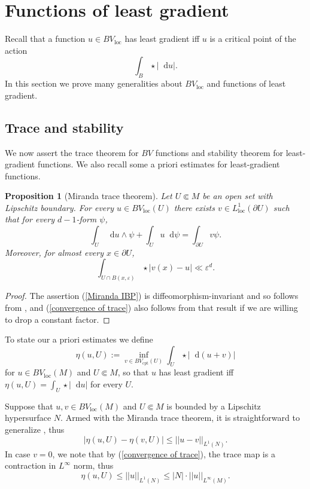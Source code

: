 \documentclass[reqno,12pt,letterpaper]{amsart}
\newcommand*\dif{\mathop{}\!\mathrm{d}}
\newcommand{\loc}{\mathrm{loc}}
\newcommand{\cpt}{\mathrm{cpt}}
\newtheorem{proposition}[theorem]{Proposition}
\theoremstyle{definition}
\numberwithin{equation}{section}
\begin{document}

\section{Functions of least gradient}\label{LeastGradientFunctions}
Recall that a function $u \in BV_\loc$ has least gradient iff $u$ is a critical point of the action
$$\int_B \star |\dif u|.$$
In this section we prove many generalities about $BV_\loc$ and functions of least gradient.

\subsection{Trace and stability}
We now assert the trace theorem for $BV$ functions and stability theorem for least-gradient functions.
We also recall some a priori estimates for least-gradient functions.

\begin{proposition}[Miranda trace theorem]\label{traces}
Let $U \Subset M$ be an open set with Lipschitz boundary.
For every $u \in BV_\loc(U)$ there exists $v \in L^1_\loc(\partial U)$ such that for every $d-1$-form $\psi$,
\begin{equation}\label{Miranda IBP}
\int_U \dif u \wedge \psi + \int_U u \dif \psi = \int_{\partial U} v\psi.
\end{equation}
Moreover, for almost every $x \in \partial U$,
\begin{equation}\label{convergence of trace}
\int_{U \cap B(x, \varepsilon)} \star |v(x) - u| \ll \varepsilon^d.
\end{equation}
\end{proposition}
\begin{proof}
The assertion (\ref{Miranda IBP}) is diffeomorphism-invariant and so follows from \cite[Teorema 1]{Miranda67}, and (\ref{convergence of trace}) also follows from that result if we are willing to drop a constant factor.
\end{proof}

To state our a priori estimates we define
$$\eta(u, U) := \inf_{v \in BV_\cpt(U)} \int_U \star |\dif(u + v)|$$
for $u \in BV_\loc(M)$ and $U \Subset M$, so that $u$ has least gradient iff $\eta(u, U) = \int_U \star |\dif u|$ for every $U$.

Suppose that $u, v \in BV_\loc(M)$ and $U \Subset M$ is bounded by a Lipschitz hypersurface $N$. Armed with the Miranda trace theorem, it is straightforward to generalize \cite[Lemma 5.6]{Giusti77}, thus
\begin{equation}
|\eta(u, U) - \eta(v, U)| \leq ||u - v||_{L^1(N)}. \label{a priori estimate 1}
\end{equation}
In case $v = 0$, we note that by (\ref{convergence of trace}), the trace map is a contraction in $L^\infty$ norm, thus
\begin{equation}
\eta(u, U) \leq ||u||_{L^1(N)} \leq |N| \cdot ||u||_{L^\infty(M)}. \label{a priori estimate 2}
\end{equation}
\end{document}
